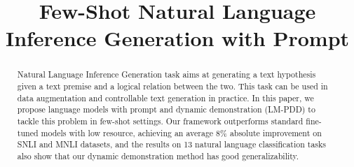 \documentclass[11pt]{article}
\title{Few-Shot Natural Language Inference Generation with Prompt}
\begin{document}
\maketitle
\begin{abstract}
Natural Language Inference Generation task aims at generating a text hypothesis 
given a text premise and a logical relation between the two. This task can be used in data augmentation and controllable text generation in practice. 
In this paper, we propose language models with prompt and dynamic demonstration (LM-PDD) to tackle this problem in few-shot settings. 
Our framework outperforms standard fine-tuned models with low 
resource, achieving an average 8\% absolute improvement on SNLI and MNLI 
datasets, and the results on 13 natural language classification tasks also
show that our dynamic demonstration method has good generalizability.      
\end{abstract}











\clearpage

\end{document}
